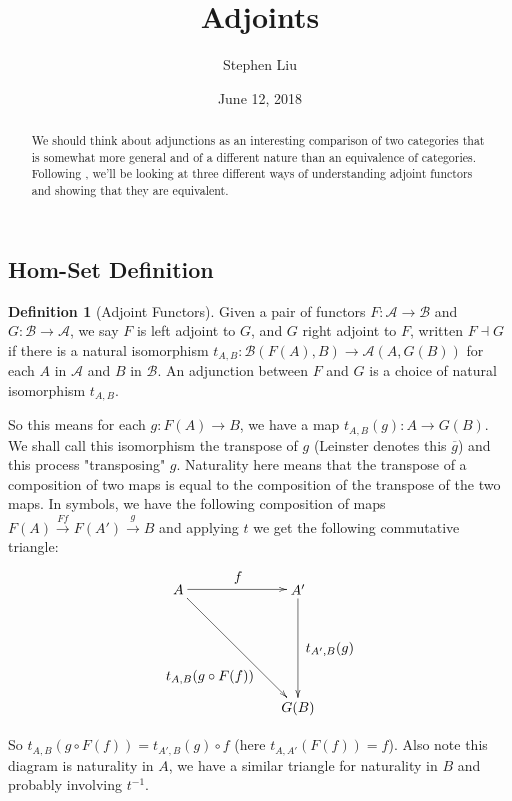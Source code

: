 \documentclass[11pt]{article}
\theoremstyle{definition}
\newtheorem*{defn}{Definition}
\theoremstyle{definition}
\theoremstyle{plain}
\theoremstyle{plain}
\theoremstyle{plain}
\begin{document}
\author{Stephen Liu}
\title{Adjoints}
\date{June 12, 2018}

\maketitle

\begin{abstract}
We should think about adjunctions as an interesting comparison of two categories that is somewhat more general and of a different nature than an equivalence of categories. Following \cite{leinster_basic_2014}, we'll be looking at three different ways of understanding adjoint functors and showing that they are equivalent.
\end{abstract}

\subsection*{Hom-Set Definition}
\begin{defn}[Adjoint Functors]
Given a pair of functors $F:\mathscr{A}\to\mathscr{B}$ and $G:\mathscr{B}\to\mathscr{A}$, we say $F$ is left adjoint to $G$, and $G$ right adjoint to $F$, written $F \dashv G$ if there is a natural isomorphism $t_{A,B}:\mathscr{B}(F(A),B) \to \mathscr{A}(A,G(B))$ for each $A$ in $\mathscr{A}$ and $B$ in $\mathscr{B}$. An adjunction between $F$ and $G$ is a choice of natural isomorphism $t_{A,B}$.
\end{defn}

So this means for each $g:F(A) \to B$, we have a map $t_{A,B}(g): A \to G(B)$. We shall call this isomorphism the transpose of $g$ (Leinster denotes this $\overline{g}$) and this process "transposing" $g$. Naturality here means that the transpose of a composition of two maps is equal to the composition of the transpose of the two maps. In symbols, we have the following composition of maps $F(A) \overset{Ff}{\rightarrow} F(A') \overset{g}{\rightarrow} B$ and applying $t$ we get the following commutative triangle:

\begin{equation*}
\begin{xy}
(0,0)*+{A}="a"; (30, 0)*+{A'}="ap"; (30, -30)*+{G(B)}="gb";
{\ar "a";"ap"}?*!/_3mm/{f};
{\ar "ap";"gb"}?*!/_8mm/{t_{A',B}(g)};
{\ar "a";"gb"}?*!/^10mm/{t_{A,B}(g \circ F(f))}
\end{xy}
\end{equation*}

So $t_{A,B}(g \circ F(f)) = t_{A',B}(g) \circ f$ (here $t_{A,A'}(F(f)) = f$). Also note this diagram is naturality in $A$, we have a similar triangle for naturality in $B$ and probably involving $t^{-1}$.
\end{document}
